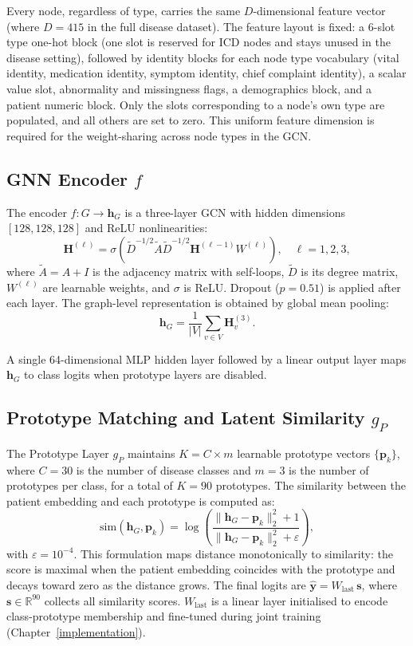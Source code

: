 Every node, regardless of type, carries the same $D$-dimensional feature vector (where $D = 415$ in the full disease dataset). The feature layout is fixed: a 6-slot type one-hot block (one slot is reserved for ICD nodes and stays unused in the disease setting), followed by identity blocks for each node type vocabulary (vital identity, medication identity, symptom identity, chief complaint identity), a scalar value slot, abnormality and missingness flags, a demographics block, and a patient numeric block. Only the slots corresponding to a node's own type are populated, and all others are set to zero. This uniform feature dimension is required for the weight-sharing across node types in the GCN.

\subsection{GNN Encoder $f$}

The encoder $f: G \rightarrow \mathbf{h}_G$ is a three-layer GCN with hidden dimensions $[128, 128, 128]$ and ReLU nonlinearities:
\[
  \mathbf{H}^{(\ell)} = \sigma\!\left(
    \tilde{D}^{-1/2}\tilde{A}\tilde{D}^{-1/2}
    \mathbf{H}^{(\ell-1)} W^{(\ell)}
  \right), \quad \ell = 1, 2, 3,
\]
where $\tilde{A} = A + I$ is the adjacency matrix with self-loops, $\tilde{D}$ is its degree matrix, $W^{(\ell)}$ are learnable weights, and $\sigma$ is ReLU. Dropout ($p = 0.51$) is applied after each layer. The graph-level representation is obtained by global mean pooling:
\[
  \mathbf{h}_G = \frac{1}{|V|}\sum_{v \in V} \mathbf{H}^{(3)}_v.
\]

A single 64-dimensional MLP hidden layer followed by a linear output layer maps $\mathbf{h}_G$ to class logits when prototype layers are disabled.

\subsection{Prototype Matching and Latent Similarity $g_P$}

The Prototype Layer $g_P$ maintains $K = C \times m$ learnable prototype vectors $\{\mathbf{p}_k\}$, where $C = 30$ is the number of disease classes and $m = 3$ is the number of prototypes per class, for a total of $K = 90$ prototypes. The similarity between the patient embedding and each prototype is computed as:
\[
  \mathrm{sim}(\mathbf{h}_G, \mathbf{p}_k)
  = \log\!\left(
      \frac{\|\mathbf{h}_G - \mathbf{p}_k\|_2^2 + 1}
           {\|\mathbf{h}_G - \mathbf{p}_k\|_2^2 + \varepsilon}
    \right),
\]
with $\varepsilon = 10^{-4}$. This formulation maps distance monotonically to similarity: the score is maximal when the patient embedding coincides with the prototype and decays toward zero as the distance grows. The final logits are $\hat{\mathbf{y}} = W_{\mathrm{last}}\, \boldsymbol{s}$, where $\boldsymbol{s} \in \mathbb{R}^{90}$ collects all similarity scores. $W_{\mathrm{last}}$ is a linear layer initialised to encode class-prototype membership and fine-tuned during joint training (Chapter~\ref{implementation}).

